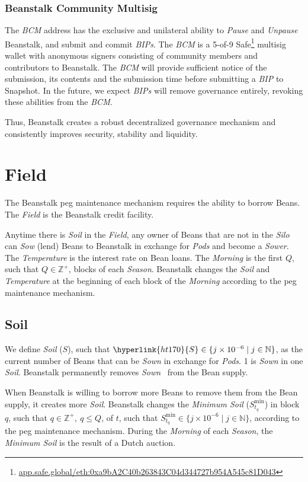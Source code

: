 \documentclass[tikz]{article}
\newcommand{\term}[1]{\textsl{#1}}
\newcommand{\fref}[1]{\footnote{\href{http://#1}{#1}}}
\newcommand{\Bean}{} %
\begin{document}
\subsubsection{Beanstalk Community Multisig}
The \term{BCM} address has the exclusive and unilateral ability to \term{Pause} and \term{Unpause} Beanstalk, and submit and commit \term{BIPs}. The \term{BCM} is a 5-of-9 Safe\fref{app.safe.global/eth:0xa9bA2C40b263843C04d344727b954A545c81D043} multisig wallet with anonymous signers consisting of community members and contributors to Beanstalk. The \term{BCM} will provide sufficient notice of the submission, its contents and the submission time before submitting a \term{BIP} to Snapshot. In the future, we expect \term{BIPs} will remove governance entirely, revoking these abilities from the \term{BCM}.

Thus, Beanstalk creates a robust decentralized governance mechanism and consistently improves security, stability and liquidity.

\section{Field}
\vspace*{-1mm}
The Beanstalk peg maintenance mechanism requires the ability to borrow Beans. The \term{Field} is the Beanstalk credit facility. 

Anytime there is \term{Soil} in the \term{Field}, any owner of Beans that are not in the \term{Silo} can \term{Sow} (lend) Beans to Beanstalk in exchange for \term{Pods} and become a \term{Sower}. The \term{Temperature} is the interest rate on Bean loans. The \term{Morning} is the first $Q$, such that ${Q} \in \mathbb{Z}^{+}$, blocks of each \term{Season}. Beanstalk changes the \term{Soil} and \term{Temperature} at the beginning of each block of the \term{Morning} according to the peg maintenance mechanism.

\subsection{Soil}
\vspace*{-1mm}
We define \term{Soil} (\hyperlink{ht170}{$S$}), such that $\hyperlink{ht170}{S} \in \{j \times 10^{-6} \mid j \in \mathbb{N} \}$, as the current number of Beans that can be \term{Sown} in exchange for \term{Pods}. \Bean1 is \term{Sown} in one \term{Soil}. Beanstalk permanently removes \term{Sown} \Bean\ from the Bean supply. 

When Beanstalk is willing to borrow more Beans to remove them from the Bean supply, it creates more \term{Soil}. Beanstalk changes the \term{Minimum Soil} ($S_{t_q}^{\text{min}}$) in block $q$, such that $q \in \mathbb{Z}^{+},\ q \leq Q$, of $t$, such that $S_{t_q}^{\text{min}} \in \{j \times 10^{-6} \mid j \in \mathbb{N} \}$, according to the peg maintenance mechanism. During the \term{Morning} of each \term{Season}, the \term{Minimum Soil} is the result of a Dutch auction.
\end{document}
